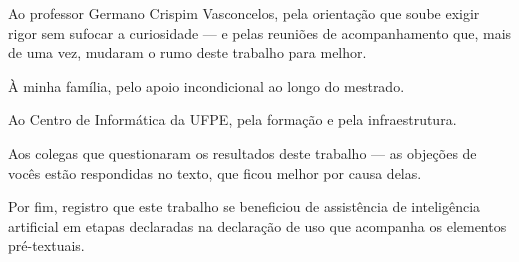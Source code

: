 Ao professor Germano Crispim Vasconcelos, pela orientação que soube
exigir rigor sem sufocar a curiosidade --- e pelas reuniões de
acompanhamento que, mais de uma vez, mudaram o rumo deste trabalho
para melhor.

À minha família, pelo apoio incondicional ao longo do mestrado.

Ao Centro de Informática da UFPE, pela formação e pela infraestrutura.

Aos colegas que questionaram os resultados deste trabalho --- as
objeções de vocês estão respondidas no texto, que ficou melhor por
causa delas.

Por fim, registro que este trabalho se beneficiou de assistência de
inteligência artificial em etapas declaradas na declaração de uso que
acompanha os elementos pré-textuais.

